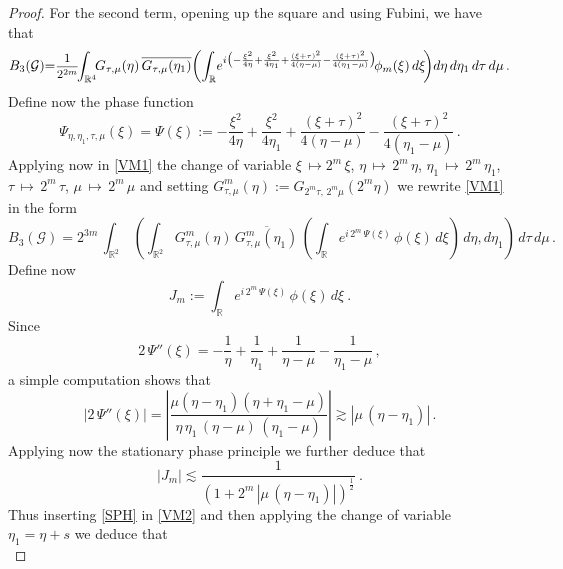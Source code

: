 \documentclass[a4paper,reqno]{amsart}
\numberwithin{equation}{section}
\theoremstyle{definition}
\newcommand{\R}{\mathbb{R}}
\newcommand{\sdfrac}[2]{\mbox{\small$\displaystyle\frac{#1}{#2}$}}
\def\G{\mathcal{G}}
\begin{document}
\begin{proof}
For the second term, opening up the square and using Fubini, we have that
\begin{equation}\label{VM1}
	B_3(\G){=}\sdfrac{1}{2^{2m}}\!\!\int_{\R^4}\!\! G_{\tau,\mu}(\eta)\,\overline{G_{\tau,\mu}(\eta_1)}\!
	\left(\int_{\R}\!e^{i\big(-\frac{\xi^2}{4 \eta}+ \frac{\xi^2}{4 \eta_1}+\frac{(\xi+\tau)^2}{4(\eta-\mu)}- \frac{(\xi+\tau)^2}{4(\eta_1-\mu)}\big)}\! \phi_m(\xi)\, d\xi\!\right)\!d\eta\, d\eta_1\, d\tau\, d\mu\,.
\end{equation}
Define now the phase function
\begin{equation}\label{Pht}
	\Psi_{\eta,\eta_1,\tau,\mu}(\xi)=\Psi(\xi):=-\frac{\xi^2}{4 \eta}+\frac{\xi^2}{4 \eta_1}+\frac{(\xi+\tau)^2}{4(\eta-\mu)}- \frac{(\xi+\tau)^2}{4(\eta_1-\mu)}\,.
\end{equation}
Applying now in \eqref{VM1} the change of variable $\xi\,\mapsto 2^{m}\,\xi$, $\eta\,\mapsto\,2^{m}\,\eta$, $\eta_1\,\mapsto\,2^{m}\,\eta_1$, $\tau\,\mapsto\,2^{m}\,\tau$, $\mu\,\mapsto\,2^{m}\,\mu$ and setting
$G^{m}_{\tau,\mu}(\eta):=G_{2^{m}\tau,\, 2^{m}\mu}(2^{m}\eta)$ we rewrite \eqref{VM1} in the form
\begin{equation}\label{VM2}
	B_3(\G)=2^{3m}\,\int_{\R^2}\,\left(\int_{\R^2} G^{m}_{\tau,\mu}(\eta)\,\overline{G^{m}_{\tau,\mu}(\eta_1)}\,
	\left(\int_{\R}e^{i\,2^m\,\Psi(\xi)}\,\phi(\xi)\,d\xi\right)\,d\eta,d\eta_1\right)\,d\tau\,d\mu\,.
\end{equation}
Define now
\begin{equation}\label{Pht0}
	J_m:=\int_{\R}e^{i\,2^m\,\Psi(\xi)}\,\phi(\xi)\,d\xi\:.
\end{equation}
Since
\begin{equation}\label{Pht1}
	2\,\Psi''(\xi)= -\frac{1}{\eta}+\frac{1}{\eta_1}+\frac{1}{\eta-\mu}-\frac{1}{\eta_1-\mu}\,,
\end{equation}
a simple computation shows that
\begin{equation}\label{Pht2}
	|2\,\Psi''(\xi)|= \left| \frac{\mu(\eta-\eta_1)(\eta+\eta_1-\mu)}{\eta\,\eta_1\,(\eta-\mu)\,(\eta_1-\mu)} \right|\gtrsim |\mu\,(\eta-\eta_1)| \,.
\end{equation}
Applying now the stationary phase principle we further deduce that
\begin{equation}\label{SPH}
	|J_m|\lesssim \frac{1}{(1+2^m\,|\mu\,(\eta-\eta_1)|)^{\frac{1}{2}}}\:.
\end{equation}
Thus inserting \eqref{SPH} in \eqref{VM2} and then applying the change of variable $\eta_1=\eta+s$ we deduce that
\begin{equation}\label{VM3}

\end{equation}
\end{proof}
\end{document}
